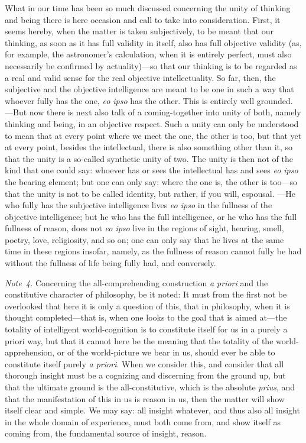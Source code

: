 \documentclass[12pt,a4paper]{book}
\begin{document}
{\small What in our time has been so much discussed concerning the unity of thinking
and being there is here occasion and call to take into consideration. First, it
seems hereby, when the matter is taken subjectively, to be meant that our thinking,
as soon as it has full validity in itself, also has full objective validity (as, for
example, the astronomer's calculation, when it is entirely perfect, must also
necessarily be confirmed by actuality)---so that our thinking is to be regarded as a
real and valid sense for the real objective intellectuality. So far, then, the
subjective and the objective intelligence are meant to be one in such a way that
whoever fully has the one, \textit{eo ipso} has the other. This is entirely well
grounded. ---But now there is next also talk of a coming-together into unity of both,
namely thinking and being, in an objective respect. Such a unity can only be
understood to mean that at every point where we meet the one, the other is too, but
that yet at every point, besides the intellectual, there is also something other
than it, so that the unity is a so-called synthetic unity of two. The unity is then
not of the kind that one could say: whoever has or sees the intellectual has and
sees \textit{eo ipso} the bearing element; but one can only say: where the one is,
the other is too---so that the unity is not to be called identity, but rather, if
you will, espousal. ---He who fully has the subjective intelligence lives
\textit{eo ipso} in the fullness of the objective intelligence; but he who has the
full intelligence, or he who has the full fullness of reason, does not \textit{eo
ipso} live in the regions of sight, hearing, smell, poetry, love, religiosity, and
so on; one can only say that he lives at the same time in these regions insofar,
namely, as the fullness of reason cannot fully be had without the fullness of life
being fully had, and conversely.\par}

{\small\emph{Note~4.} Concerning the all-comprehending construction \textit{a priori}
and the constitutive character of philosophy, be it noted: It must from the first not
be overlooked that here it is only a question of this, that in philosophy, when it is
thought completed---that is, when one looks to the goal that is aimed at---the
totality of intelligent world-cognition is to constitute itself for us in a purely a
priori way, but that it cannot here be the meaning that the totality of the
world-apprehension, or of the world-picture we bear in us, should ever be able to
constitute itself purely \textit{a priori}. When we consider this, and consider that
all thorough insight must be a cognizing and discerning from the ground up, but that
the ultimate ground is the all-constitutive, which is the absolute \textit{prius},
and that the manifestation of this in us is reason in us, then the matter will show
itself clear and simple. We may say: all insight whatever, and thus also all insight
in the whole domain of experience, must both come from, and show itself as coming
from, the fundamental source of insight, reason.\par}
\end{document}
